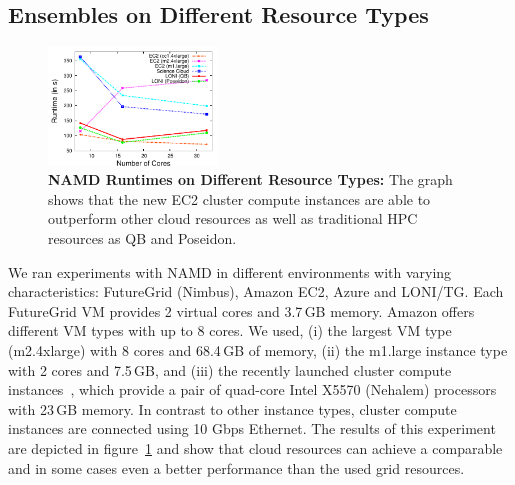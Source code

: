 \documentclass[conference,final]{IEEEtran}
\newcommand{\up}{\vspace*{-1em}}
\newcommand{\alnote}[1]{ {\textcolor{blue} { ***AL: #1 }}}
\newcommand{\jhanote}[1]{ {\textcolor{red} { ***SJ: #1 }}}
\newcommand{\alnote}[1]{}
\newcommand{\jhanote}[1]{}
\begin{document}

\subsection{Ensembles on Different Resource Types}
\up
\label{sec:performance_namd}

\begin{figure}[t]
    \centering
        \includegraphics[width=0.4\textwidth]{performance/namd_run}
    \caption{\textbf{NAMD Runtimes on Different Resource Types: } The
          graph shows that the new EC2 cluster compute instances are 
          able to outperform other cloud resources as well as traditional
          HPC resources as QB and Poseidon. %
          \up}
    \label{fig:performance_namd_run}

\end{figure}


We ran experiments with NAMD in different environments with varying
characteristics: FutureGrid (Nimbus), Amazon EC2, Azure and LONI/TG.
Each FutureGrid VM provides 2 virtual cores and 3.7\,GB memory.
Amazon offers different VM types with up to 8 cores. We used, (i) the
largest VM type (m2.4xlarge) with 8 cores and 68.4\,GB of memory, (ii)
the m1.large instance type with 2 cores and 7.5\,GB, and (iii) the
recently launched cluster compute instances~\cite{ec2-cc}, which
provide a pair of quad-core Intel X5570 (Nehalem) processors with
23\,GB memory. In contrast to other instance types, cluster compute
instances are connected using 10 Gbps Ethernet. The results
of this experiment are depicted in figure~\ref{fig:performance_namd_run}
and show that cloud resources can achieve a comparable and in some cases even
a better performance than the used grid resources.
\end{document}
